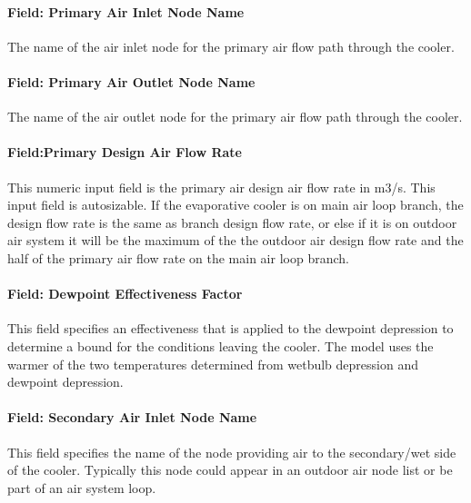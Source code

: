 \paragraph{Field: Primary Air Inlet Node Name}\label{field-primary-air-inlet-node-name-2}

The name of the air inlet node for the primary air flow path through the cooler.

\paragraph{Field: Primary Air Outlet Node Name}\label{field-primary-air-outlet-node-name-2}

The name of the air outlet node for the primary air flow path through the cooler.

\paragraph{Field:Primary Design Air Flow Rate}\label{fieldprimary-design-air-flow-rate-1}

This numeric input field is the primary air design air flow rate in m3/s. This input field is autosizable. If the evaporative cooler is on main air loop branch, the design flow rate is the same as branch design flow rate, or else if it is on outdoor air system it will be the maximum of the the outdoor air design flow rate and the half of the primary air flow rate on the main air loop branch.

\paragraph{Field: Dewpoint Effectiveness Factor}\label{field-dewpoint-effectiveness-factor}

This field specifies an effectiveness that is applied to the dewpoint depression to determine a bound for the conditions leaving the cooler. The model uses the warmer of the two temperatures determined from wetbulb depression and dewpoint depression.

\paragraph{Field: Secondary Air Inlet Node Name}\label{field-secondary-air-inlet-node-name-2}

This field specifies the name of the node providing air to the secondary/wet side of the cooler. Typically this node could appear in an outdoor air node list or be part of an air system loop.

